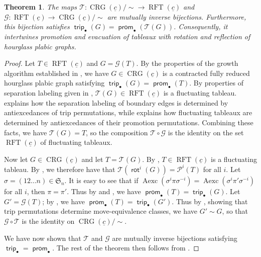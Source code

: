 \documentclass{amsart}
\newtheorem{theorem}{Theorem}[section]
\theoremstyle{definition}
\theoremstyle{remark}
\numberwithin{equation}{section}
\DeclareMathOperator{\trip}{\mathsf{trip}}
\DeclareMathOperator{\rft}{RFT}
\DeclareMathOperator{\aexc}{\mathrm{Aexc}}
\DeclareMathOperator{\prom}{\mathsf{prom}}
\DeclareMathOperator{\rot}{\mathsf{rot}}
\DeclareMathOperator{\crg}{CRG}
\begin{document}
\begin{theorem}
\label{thm:main-bijection}
The maps $\mathcal{T}:\crg(\underline{c})/{\sim} \to \rft(\underline{c})$ and $\mathcal{G}:\rft(\underline{c}) \to \crg(\underline{c})/{\sim}$ are mutually inverse bijections. Furthermore, this bijection satisfies $\trip_{\bullet}(G)=\prom_{\bullet}(\mathcal{T}(G))$. Consequently, it intertwines promotion and evacuation of tableaux with rotation and reflection of hourglass plabic graphs.
\end{theorem}
\begin{proof}
Let $T \in \rft(\underline{c})$ and $G=\mathcal{G}(T)$. By the properties of the growth algorithm established in , we have $G \in \crg(\underline{c})$ is a contracted fully reduced hourglass plabic graph satisfying $\trip_{\bullet}(G)=\prom_{\bullet}(T)$. By properties of separation labeling given in , $\mathcal{T}(G) \in \rft(\underline{c})$ is a fluctuating tableau.  explains how the separation labeling of boundary edges is determined by antiexcedances of trip permutations, while \cite[Thm.~6.12]{fluctuating-paper} explains how fluctuating tableaux are determined by antiexcedances of their promotion permutations. Combining these facts, we have $\mathcal{T}(G)=T$, so the composition $\mathcal{T} \circ \mathcal{G}$ is the identity on the set $\rft(\underline{c})$ of fluctuating tableaux. 

Now let $G \in \crg(\underline{c})$ and let $T=\mathcal{T}(G)$. By , $T \in \rft(\underline{c})$ is a fluctuating tableau. By , we therefore have that $\mathcal{T}(\rot^i(G))=\mathcal{P}^i(T)$ for all $i$. Let $\sigma=(1 2 \ldots n) \in \mathfrak{S}_n$. It is easy to see that if $\aexc(\sigma^i \pi \sigma^{-i}) = \aexc(\sigma^i \pi' \sigma^{-i})$ for all $i$, then $\pi=\pi'$. Thus by \cite[Thms.~6.7 \& 6.12]{fluctuating-paper} and , we have $\prom_{\bullet}(T)=\trip_{\bullet}(G)$. Let $G'=\mathcal{G}(T)$; by , we have $\prom_{\bullet}(T)=\trip_{\bullet}(G')$. Thus by , showing that trip permutations determine move-equivalence classes, we have $G' \sim G$, so that $\mathcal{G} \circ \mathcal{T}$ is the identity on $\crg(\underline{c})/{\sim}$.

We have now shown that $\mathcal{T}$ and $\mathcal{G}$ are mutually inverse bijections satisfying $\trip_{\bullet}=\prom_{\bullet}$. The rest of the theorem then follows from .
\end{proof}
\end{document}
